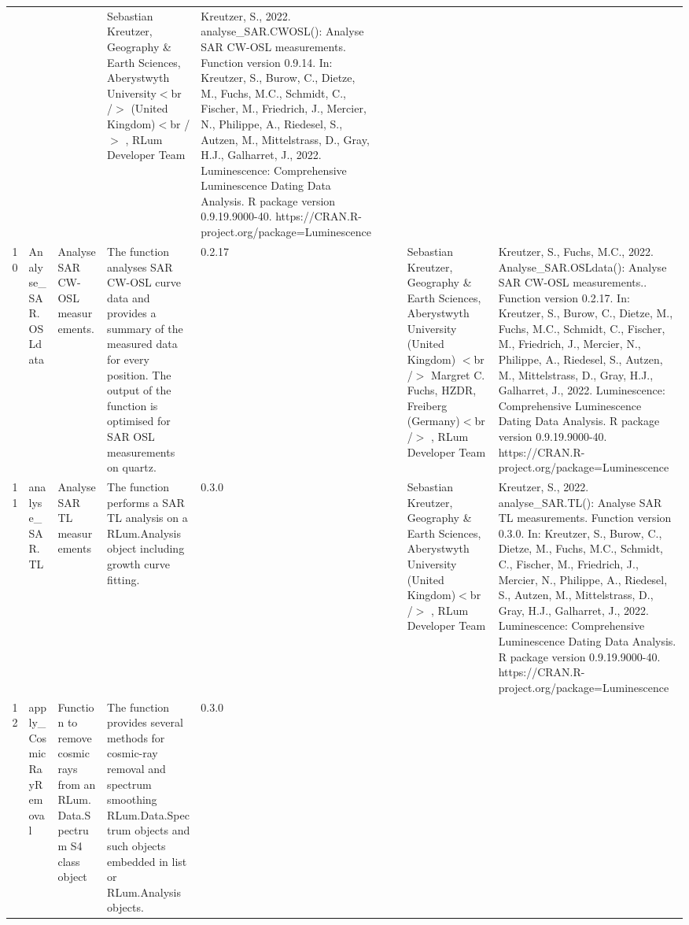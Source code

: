 \begin{table}[ht]
\begin{tabular}{rllllllll}
 &  &  & Sebastian Kreutzer, Geography \& Earth Sciences, Aberystwyth University$<$br /$>$ (United Kingdom)$<$br /$>$ , RLum Developer Team & Kreutzer, S., 2022. analyse\_SAR.CWOSL(): Analyse SAR CW-OSL measurements. Function version 0.9.14. In: Kreutzer, S., Burow, C., Dietze, M., Fuchs, M.C., Schmidt, C., Fischer, M., Friedrich, J., Mercier, N., Philippe, A., Riedesel, S., Autzen, M., Mittelstrass, D., Gray, H.J., Galharret, J., 2022. Luminescence: Comprehensive Luminescence Dating Data Analysis. R package version 0.9.19.9000-40. https://CRAN.R-project.org/package=Luminescence
 \\ 
  10 & Analyse\_SAR.OSLdata & Analyse SAR CW-OSL measurements. & The function analyses SAR CW-OSL curve data and provides a summary of the measured data for every position. The output of the function is optimised for SAR OSL measurements on quartz. & 0.2.17
 &  &  & Sebastian Kreutzer, Geography \& Earth Sciences, Aberystwyth University (United Kingdom) $<$br /$>$ Margret C. Fuchs, HZDR, Freiberg (Germany)$<$br /$>$ , RLum Developer Team & Kreutzer, S., Fuchs, M.C., 2022. Analyse\_SAR.OSLdata(): Analyse SAR CW-OSL measurements.. Function version 0.2.17. In: Kreutzer, S., Burow, C., Dietze, M., Fuchs, M.C., Schmidt, C., Fischer, M., Friedrich, J., Mercier, N., Philippe, A., Riedesel, S., Autzen, M., Mittelstrass, D., Gray, H.J., Galharret, J., 2022. Luminescence: Comprehensive Luminescence Dating Data Analysis. R package version 0.9.19.9000-40. https://CRAN.R-project.org/package=Luminescence
 \\ 
  11 & analyse\_SAR.TL & Analyse SAR TL measurements & The function performs a SAR TL analysis on a RLum.Analysis  object including growth curve fitting. & 0.3.0
 &  &  & Sebastian Kreutzer, Geography \& Earth Sciences, Aberystwyth University (United Kingdom)$<$br /$>$ , RLum Developer Team & Kreutzer, S., 2022. analyse\_SAR.TL(): Analyse SAR TL measurements. Function version 0.3.0. In: Kreutzer, S., Burow, C., Dietze, M., Fuchs, M.C., Schmidt, C., Fischer, M., Friedrich, J., Mercier, N., Philippe, A., Riedesel, S., Autzen, M., Mittelstrass, D., Gray, H.J., Galharret, J., 2022. Luminescence: Comprehensive Luminescence Dating Data Analysis. R package version 0.9.19.9000-40. https://CRAN.R-project.org/package=Luminescence
 \\ 
  12 & apply\_CosmicRayRemoval & Function to remove cosmic rays from an RLum.Data.Spectrum S4 class object & The function provides several methods for cosmic-ray removal and spectrum smoothing  RLum.Data.Spectrum  objects and such objects embedded in  list  or RLum.Analysis  objects. & 0.3.0

\end{tabular}
\end{table}
